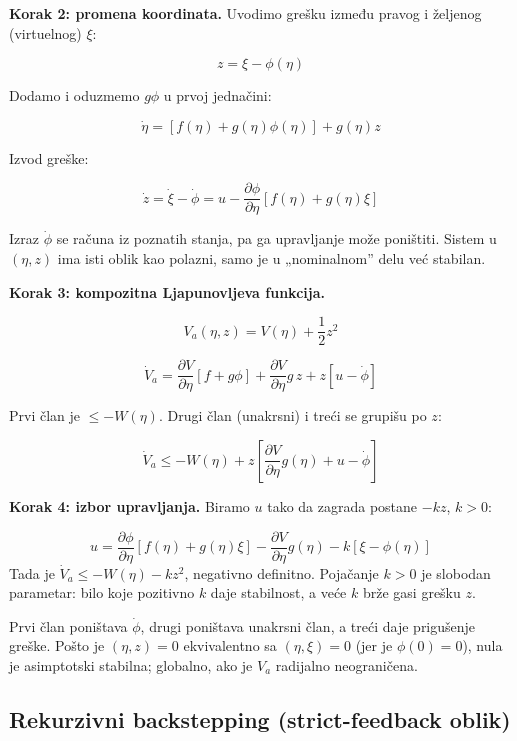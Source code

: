 \documentclass[11pt,a4paper,parskip=half,headsepline,numbers=noenddot]{scrartcl}
\begin{document}
\textbf{Korak 2: promena koordinata.} Uvodimo grešku između pravog i željenog (virtuelnog) \(\xi\):

\[z = \xi - \phi(\eta)\]

Dodamo i oduzmemo \(g\phi\) u prvoj jednačini:

\[\dot\eta = \left[f(\eta) + g(\eta)\phi(\eta)\right] + g(\eta)z\]

Izvod greške:

\[\dot z = \dot\xi - \dot\phi = u - \frac{\partial\phi}{\partial\eta}\left[f(\eta) + g(\eta)\xi\right]\]

Izraz \(\dot\phi\) se računa iz poznatih stanja, pa ga upravljanje može poništiti. Sistem u \((\eta, z)\) ima isti oblik kao polazni, samo je u „nominalnom'' delu već stabilan.

\textbf{Korak 3: kompozitna Ljapunovljeva funkcija.}

\[V_a(\eta, z) = V(\eta) + \frac12z^2\]

\[\dot V_a = \frac{\partial V}{\partial\eta}\left[f + g\phi\right] + \frac{\partial V}{\partial\eta}g\,z + z\left[u - \dot\phi\right]\]

Prvi član je \(\le -W(\eta)\). Drugi član (unakrsni) i treći se grupišu po \(z\):

\[\dot V_a \le -W(\eta) + z\left[\frac{\partial V}{\partial\eta}g(\eta) + u - \dot\phi\right]\]

\textbf{Korak 4: izbor upravljanja.} Biramo \(u\) tako da zagrada postane \(-kz\), \(k > 0\):

\begin{kljucna}
\[u = \frac{\partial\phi}{\partial\eta}\left[f(\eta) + g(\eta)\xi\right] - \frac{\partial V}{\partial\eta}g(\eta) - k\left[\xi - \phi(\eta)\right]\]
Tada je \(\dot V_a \le -W(\eta) - kz^2\), negativno definitno. Pojačanje \(k > 0\) je slobodan parametar: bilo koje pozitivno \(k\) daje stabilnost, a veće \(k\) brže gasi grešku \(z\).
\end{kljucna}

Prvi član poništava \(\dot\phi\), drugi poništava unakrsni član, a treći daje prigušenje greške. Pošto je \((\eta, z) = 0\) ekvivalentno sa \((\eta, \xi) = 0\) (jer je \(\phi(0) = 0\)), nula je asimptotski stabilna; globalno, ako je \(V_a\) radijalno neograničena.

\subsection{Rekurzivni backstepping (strict-feedback oblik)}
\end{document}
